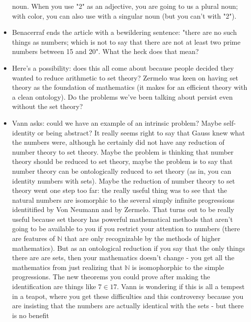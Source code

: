 \documentclass[12pt]{article}
\theoremstyle{definition}
\begin{document}
\begin{itemize}
        noun. When you use "2" as an adjective, you are going to us a plural
        noun; with color, you can also use with a singular noun (but you can't
        with "2").
    \item
        Benacerraf ends the article with a bewildering sentence: "there are no
        such things as numbers; which is not to say that there are not at least
        two prime numbers between 15 and 20". What the heck does that mean?
    \item
        Here's a possibility: does this all come about because people decided
        they wanted to reduce arithmetic to set theory? Zermelo was keen on
        having set theory as the foundation of mathematics (it makes for an
        efficient theory with a clean ontology). Do the problems we've been
        talking about persist even without the set theory?
    \item
        Vann asks: could we have an example of an intrinsic problem? Maybe
        self-identity or being abstract? It really seems right to say that
        Gauss knew what the numbers were, although he certainly did not have
        any reduction of number theory to set theory. Maybe the problem is
        thinking that number theory should be reduced to set theory, maybe the
        problem is to say that number theory can be ontologically reduced to
        set theory (as in, you can identity numbers with sets). Maybe the
        reduction of number theory to set theory went one step too far: the
        really useful thing was to see that the natural numbers are isomorphic
        to the several simply infinite progressions identitified by Von Neumann
        and by Zermelo. That turns out to be really useful because set theory
        has powerful mathematical methods that aren't going to be available to
        you if you restrict your attention to numbers (there are features of
        $\mathbb{N}$ that are only recognizable by the methods of higher
        mathematics). But as an ontological reduction if you say that the only
        things there are are sets, then your mathematics doesn't change - you
        get all the mathematics from just realizing that $\mathbb{N}$ is
        isomophorphic to the simple progressions. The new theorems you could
        prove after making the identification are things like $7 \in 17$. Vann
        is wondering if this is all a tempest in a teapot, where you get these
        difficulties and this controversy because you are insisting that the
        numbers are actually identical with the sets - but there is no benefit

\end{itemize}
\end{document}
